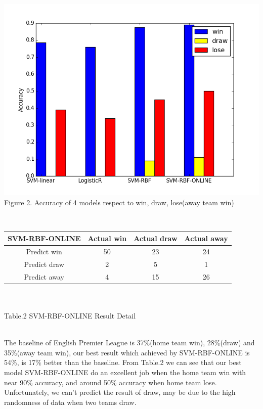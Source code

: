 \documentclass[conference,11pt]{article}
\begin{document}
\begin{center}
\includegraphics[scale = 0.5]{figure_2.png}\\
Figure 2. Accuracy of 4 models respect to win, draw, lose(away team win)
\end{center}
\ \\
\begin{center}

\begin{tabular}{|c|ccc|}
      \hline
      SVM-RBF-ONLINE       &Actual win & Actual draw  & Actual away \\
      \hline
      Predict win     & 50  & 23 & 24  \\
      Predict draw     & 2  & 5 &1\\
      Predict away     & 4 & 15 &26\\
      \hline
    \end{tabular}\\
    \ \\
    {\small Table.2 SVM-RBF-ONLINE Result Detail}
\end{center}
\ \\
The baseline of English Premier League is 37\%(home team win), 28\%(draw) and 35\%(away team win), our best result which achieved by SVM-RBF-ONLINE is 54\%, is 17\% better than the baseline. From Table.2 we can see that our best model SVM-RBF-ONLINE do an excellent job when the home team win with near 90\% accuracy, and around 50\% accuracy when home team lose. Unfortunately, we can't predict the result of draw, may be due to the high randomness of data when two teams draw.
\end{document}
